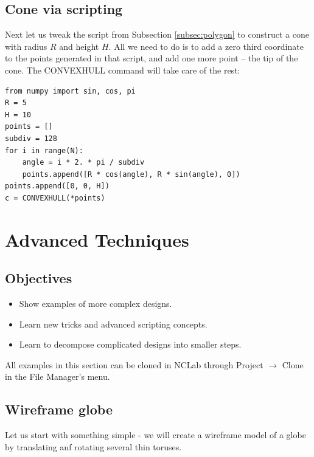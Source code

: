 \subsection{Cone via scripting}\label{par:cocon}

Next let us tweak the script
from Subsection \ref{subsec:polygon} to construct a cone with radius
$R$ and height $H$. All we need to do is to add a zero third coordinate 
to the points generated in that script, and add one more point -- the 
tip of the cone. The CONVEXHULL command will take care of the rest:\\

\begin{bbox}
\begin{verbatim}
from numpy import sin, cos, pi
R = 5
H = 10
points = []
subdiv = 128
for i in range(N):
    angle = i * 2. * pi / subdiv
    points.append([R * cos(angle), R * sin(angle), 0])
points.append([0, 0, H])
c = CONVEXHULL(*points)
\end{verbatim}
\end{bbox}
\noindent




\section{Advanced Techniques}

\subsection{Objectives}
\begin{itemize}
\item Show examples of more complex designs.
\item Learn new tricks and advanced scripting concepts.
\item Learn to decompose complicated designs into smaller steps.
\end{itemize}
All examples in this section can be cloned in NCLab through 
Project $\rightarrow$ Clone in the File Manager's menu.

\subsection{Wireframe globe}

Let us start with something simple - we will create a wireframe model 
of a globe by translating anf rotating several thin toruses.\\

